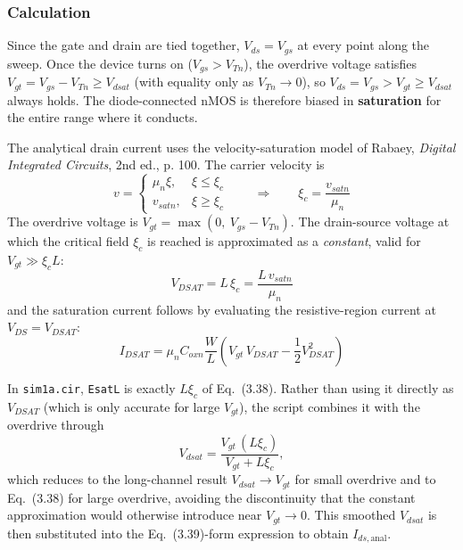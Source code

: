 \subsubsection{Calculation}

Since the gate and drain are tied together, $V_{ds} = V_{gs}$ at every point along the sweep. Once the device turns on ($V_{gs} > V_{Tn}$), the overdrive voltage satisfies $V_{gt} = V_{gs} - V_{Tn} \geq V_{dsat}$ (with equality only as $V_{Tn} \to 0$), so $V_{ds} = V_{gs} > V_{gt} \geq V_{dsat}$ always holds. The diode-connected nMOS is therefore biased in \textbf{saturation} for the entire range where it conducts.

The analytical drain current uses the velocity-saturation model of Rabaey, \emph{Digital Integrated Circuits}, 2nd ed., p. 100. The carrier velocity is
\[
v =
\begin{cases}
\mu_n \xi, & \xi \le \xi_c \\
v_{satn}, & \xi \ge \xi_c
\end{cases}
\qquad \Rightarrow \qquad \xi_c = \frac{v_{satn}}{\mu_n} \tag{3.37}
\]
The overdrive voltage is $V_{gt} = \max(0,\ V_{gs} - V_{Tn})$. The drain-source voltage at which the critical field $\xi_c$ is reached is approximated as a \emph{constant}, valid for $V_{gt} \gg \xi_c L$:
\[
V_{DSAT} = L\,\xi_c = \frac{L\,v_{satn}}{\mu_n} \tag{3.38}
\]
and the saturation current follows by evaluating the resistive-region current at $V_{DS} = V_{DSAT}$:
\[
I_{DSAT} = \mu_n C_{oxn} \frac{W}{L}\left(V_{gt}\,V_{DSAT} - \frac{1}{2}V_{DSAT}^2\right) \tag{3.39}
\]

In \texttt{sim1a.cir}, \texttt{EsatL} is exactly $L\xi_c$ of Eq.~(3.38). Rather than using it directly as $V_{DSAT}$ (which is only accurate for large $V_{gt}$), the script combines it with the overdrive through
\[
V_{dsat} = \frac{V_{gt}\,(L\xi_c)}{V_{gt} + L\xi_c},
\]
which reduces to the long-channel result $V_{dsat} \to V_{gt}$ for small overdrive and to Eq.~(3.38) for large overdrive, avoiding the discontinuity that the constant approximation would otherwise introduce near $V_{gt} \to 0$. This smoothed $V_{dsat}$ is then substituted into the Eq.~(3.39)-form expression to obtain $I_{ds,\text{anal}}$.

\begin{center}
\end{center}

